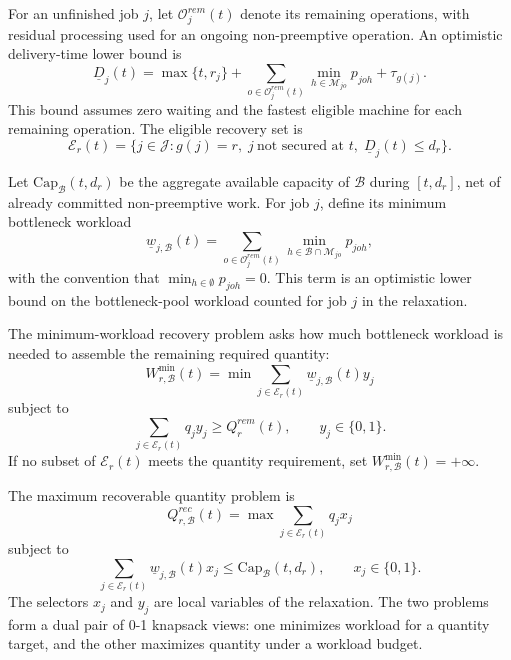 \documentclass[a4paper,fleqn]{cas-sc}
\begin{document}
For an unfinished job \(j\), let \(\mathcal O_j^{rem}(t)\) denote its remaining operations, with residual processing used for an ongoing non-preemptive operation. An optimistic delivery-time lower bound is
\begin{equation}
\underline D_j(t)=
\max\{t,r_j\}
+
\sum_{o\in\mathcal O_j^{rem}(t)}
\min_{h\in\mathcal M_{jo}}p_{joh}
+
\tau_{g(j)}.
\label{eq:opt_delivery}
\end{equation}
This bound assumes zero waiting and the fastest eligible machine for each remaining operation. The eligible recovery set is
\begin{equation}
\mathcal E_r(t)=
\{j\in\mathcal J:g(j)=r,\;j\ \text{not secured at }t,\;\underline D_j(t)\le d_r\}.
\label{eq:eligible_set}
\end{equation}

Let \(\mathrm{Cap}_{\mathcal B}(t,d_r)\) be the aggregate available capacity of \(\mathcal B\) during \([t,d_r]\), net of already committed non-preemptive work. For job \(j\), define its minimum bottleneck workload
\begin{equation}
\underline w_{j,\mathcal B}(t)=
\sum_{o\in\mathcal O_j^{rem}(t)}
\min_{h\in\mathcal B\cap\mathcal M_{jo}}p_{joh},
\label{eq:min_bottleneck_work}
\end{equation}
with the convention that \(\min_{h\in\emptyset}p_{joh}=0\). This term is an optimistic lower bound on the bottleneck-pool workload counted for job \(j\) in the relaxation.

The minimum-workload recovery problem asks how much bottleneck workload is needed to assemble the remaining required quantity:
\begin{equation}
W_{r,\mathcal B}^{\min}(t)=
\min
\sum_{j\in\mathcal E_r(t)}
\underline w_{j,\mathcal B}(t)y_j
\label{eq:min_workload}
\end{equation}
subject to
\begin{equation}
\sum_{j\in\mathcal E_r(t)}q_jy_j\ge Q_r^{rem}(t),
\qquad
y_j\in\{0,1\}.
\label{eq:min_workload_quantity}
\end{equation}
If no subset of \(\mathcal E_r(t)\) meets the quantity requirement, set \(W_{r,\mathcal B}^{\min}(t)=+\infty\).

The maximum recoverable quantity problem is
\begin{equation}
Q_{r,\mathcal B}^{rec}(t)=
\max
\sum_{j\in\mathcal E_r(t)}q_jx_j
\label{eq:recoverable_quantity}
\end{equation}
subject to
\begin{equation}
\sum_{j\in\mathcal E_r(t)}
\underline w_{j,\mathcal B}(t)x_j
\le
\mathrm{Cap}_{\mathcal B}(t,d_r),
\qquad
x_j\in\{0,1\}.
\label{eq:recoverable_capacity}
\end{equation}
The selectors \(x_j\) and \(y_j\) are local variables of the relaxation. The two problems form a dual pair of 0-1 knapsack views: one minimizes workload for a quantity target, and the other maximizes quantity under a workload budget.
\end{document}
